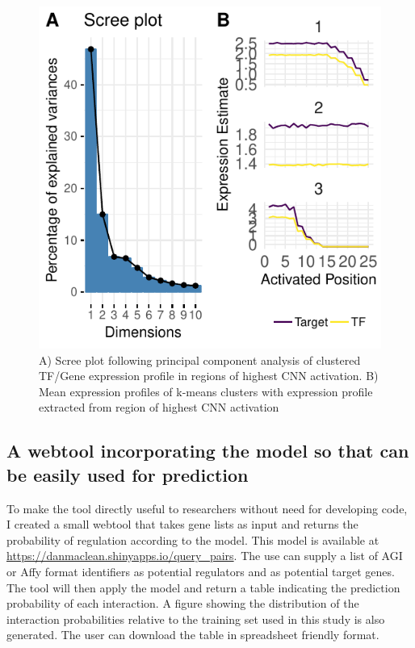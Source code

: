 \documentclass[12pt,a4paper,]{article}
\begin{document}
\begin{figure}
\centering
\includegraphics{../analysis/figure4.pdf}
\caption{\label{fig:activationprofiles}A) Scree plot following principal component analysis of clustered TF/Gene expression profile in regions of highest CNN activation. B) Mean expression profiles of k-means clusters with expression profile extracted from region of highest CNN activation}
\end{figure}

\hypertarget{a-webtool-incorporating-the-model-so-that-can-be-easily-used-for-prediction}{%
\subsection{A webtool incorporating the model so that can be easily used for prediction}\label{a-webtool-incorporating-the-model-so-that-can-be-easily-used-for-prediction}}

To make the tool directly useful to researchers without need for developing code, I created a small webtool that takes gene lists as input and returns the probability of regulation according to the model. This model is available at \href{}{https://danmaclean.shinyapps.io/query\_pairs}. The use can supply a list of AGI or Affy format identifiers as potential regulators and as potential target genes. The tool will then apply the model and return a table indicating the prediction probability of each interaction. A figure showing the distribution of the interaction probabilities relative to the training set used in this study is also generated. The user can download the table in spreadsheet friendly format.
\end{document}
